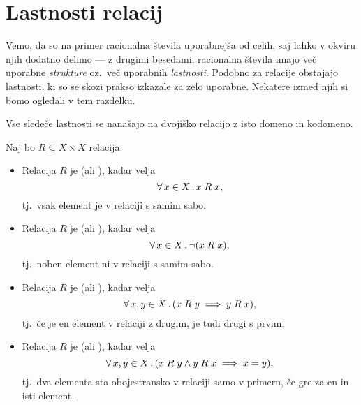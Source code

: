 	
	\section{Lastnosti relacij}
	
		Vemo, da so na primer racionalna števila uporabnejša od celih, saj lahko v okviru njih dodatno delimo --- z drugimi besedami, racionalna števila imajo več uporabne \emph{strukture} oz.~več uporabnih \emph{lastnosti}. Podobno za relacije obstajajo lastnosti, ki so se skozi prakso izkazale za zelo uporabne. Nekatere izmed njih si bomo ogledali v tem razdelku.
		
		Vse sledeče lastnosti se nanašajo na dvojiško relacijo z isto domeno in kodomeno.
		
		\begin{definicija}
			Naj bo $R \subseteq X \times X$ relacija.
			\begin{itemize}
				\item
					Relacija $R$ je  (ali ), kadar velja
					\[\xall{x}[X]{x \mathrel{R} x},\]
					tj.~vsak element je v relaciji s samim sabo.
				\item
					Relacija $R$ je  (ali ), kadar velja
					\[\xall{x}[X]{\lnot(x \mathrel{R} x)},\]
					tj.~noben element ni v relaciji s samim sabo.
				\item
					Relacija $R$ je  (ali ), kadar velja
					\[\all{x, y}[X]{x \mathrel{R} y \implies y \mathrel{R} x},\]
					tj.~če je en element v relaciji z drugim, je tudi drugi s prvim.
				\item
					Relacija $R$ je  (ali ), kadar velja
					\[\all{x, y}[X]{x \mathrel{R} y \land y \mathrel{R} x \implies x = y},\]
					tj.~dva elementa sta obojestransko v relaciji samo v primeru, če gre za en in isti element.
					

\end{itemize}
\end{definicija}
